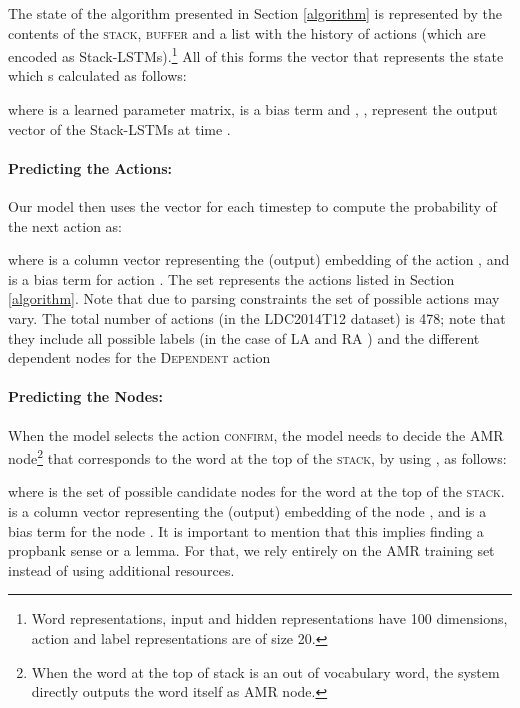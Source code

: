 \documentclass[11pt,a4paper]{article}
\begin{document}
The state of the algorithm presented in Section \ref{algorithm} is represented by the contents of the 
\textsc{stack}, \textsc{buffer}  and a list with the history of actions (which are encoded as Stack-LSTMs).\footnote{
Word representations, input and hidden representations have 100 dimensions, action and label representations 
are of size 20.}
All of this forms the vector   that represents the state which s calculated as follows:

\vspace{-0.25cm}



\noindent where  is a learned parameter matrix,  is a bias term and ,
, represent the output vector of the Stack-LSTMs at 
time .

\paragraph{Predicting the Actions:}
Our model then uses the vector  for each timestep  to compute the 
probability of the next action as:

\vspace{-0.15cm}





\noindent where  is a column vector representing the (output) embedding of the action , 
and  is a bias term for action . The set  represents the actions 
listed in Section \ref{algorithm}. Note that due to parsing constraints the set of possible actions 
may vary. The total number of actions (in the LDC2014T12 dataset) is 478; note 
that they include all possible labels (in the case of \textsc{LA} and \textsc{RA} ) and the different dependent 
nodes for the \textsc{Dependent} action

\paragraph{Predicting the Nodes:}
When the model selects the action \textsc{confirm}, the model needs to 
decide the AMR node\footnote{When the word at the top of stack is an out of vocabulary word, 
the system directly outputs the word itself as AMR node.} that corresponds to the word at the top 
of the \textsc{stack}, by using  , as follows:
\vspace{-0.15cm}


\noindent where  is 
the set of possible candidate nodes for the word at the top of the \textsc{stack}.   is a column 
vector representing the (output) embedding of the node , and  is a bias term for the node 
.  It is important to mention that this implies finding a propbank sense or a lemma. For that, we 
rely entirely on the AMR training set instead of using additional resources.
\end{document}
